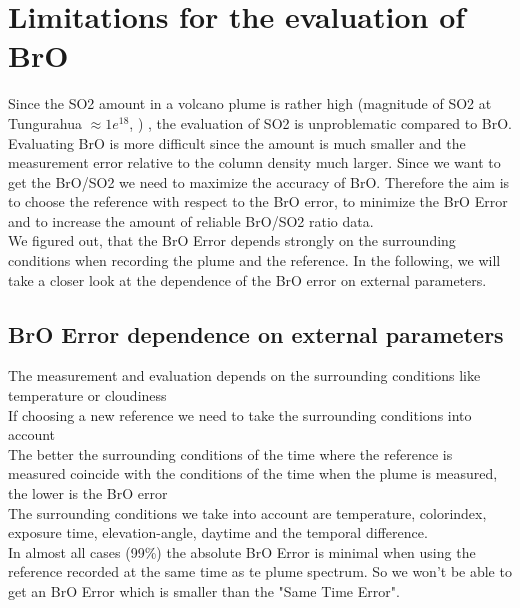 \documentclass  [
  paper    = a4,
  BCOR     = 10mm,
  twoside,
  fontsize = 12pt,
  fleqn,
  toc      = bibnumbered,
  toc      = listofnumbered,
  numbers  = noendperiod,
  headings = normal,
  listof   = leveldown,
  version  = 3.03
]                                       {scrreprt}
\begin{document}
	\chapter{Limitations for the evaluation of  BrO}
    Since the SO2 amount in a volcano plume is rather high (magnitude of SO2 at Tungurahua $\approx 1e^{18}$, \cite{WarnachSimon}) , the evaluation of SO2 is unproblematic compared to BrO.\\
	Evaluating BrO is more difficult since the amount is much smaller and the measurement error relative to the column density much larger. Since we want to get the BrO/SO2 we need to maximize the accuracy of BrO.
	Therefore the aim is to choose the reference with respect to the BrO error, to minimize the BrO Error and to increase the amount of reliable BrO/SO2 ratio data.\\
	We figured out, that the BrO Error depends strongly on the surrounding conditions when recording the plume and the reference. In the following, we will take a closer look at the dependence of the BrO error on external parameters. 
	\section{BrO Error dependence on external parameters}
	The measurement and evaluation depends on the surrounding conditions like temperature or cloudiness \cite{lubcke2014optical}\\
	If choosing a new reference we need to take the surrounding conditions into account\\
	The better the surrounding conditions of the time where the reference is measured coincide with the conditions of the time when the plume is measured, the lower is the BrO error \\
	The surrounding conditions we take into account are temperature, colorindex, exposure time, elevation-angle, daytime and the temporal difference.\\
	In almost all cases (99\%) the absolute BrO Error is minimal when using the reference recorded at the same time as te plume spectrum. So we won't be able to get an BrO Error which is smaller than the "Same Time Error".   

	
\end{document}
